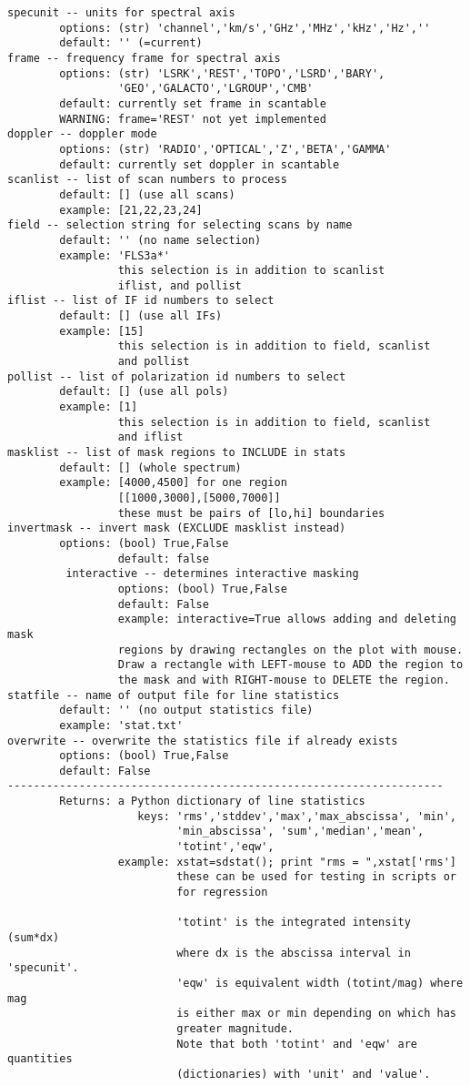 \begin{verbatim}
specunit -- units for spectral axis
        options: (str) 'channel','km/s','GHz','MHz','kHz','Hz',''
        default: '' (=current)
frame -- frequency frame for spectral axis
        options: (str) 'LSRK','REST','TOPO','LSRD','BARY',
                 'GEO','GALACTO','LGROUP','CMB'
        default: currently set frame in scantable
        WARNING: frame='REST' not yet implemented
doppler -- doppler mode
        options: (str) 'RADIO','OPTICAL','Z','BETA','GAMMA'
        default: currently set doppler in scantable
scanlist -- list of scan numbers to process
        default: [] (use all scans)
        example: [21,22,23,24]
field -- selection string for selecting scans by name
        default: '' (no name selection)
        example: 'FLS3a*'
                 this selection is in addition to scanlist
                 iflist, and pollist
iflist -- list of IF id numbers to select
        default: [] (use all IFs)
        example: [15]
                 this selection is in addition to field, scanlist
                 and pollist
pollist -- list of polarization id numbers to select
        default: [] (use all pols)
        example: [1]
                 this selection is in addition to field, scanlist
                 and iflist
masklist -- list of mask regions to INCLUDE in stats
        default: [] (whole spectrum)
        example: [4000,4500] for one region
                 [[1000,3000],[5000,7000]]
                 these must be pairs of [lo,hi] boundaries
invertmask -- invert mask (EXCLUDE masklist instead)
        options: (bool) True,False
                 default: false
         interactive -- determines interactive masking
                 options: (bool) True,False
                 default: False
                 example: interactive=True allows adding and deleting mask 
                 regions by drawing rectangles on the plot with mouse. 
                 Draw a rectangle with LEFT-mouse to ADD the region to 
                 the mask and with RIGHT-mouse to DELETE the region. 
statfile -- name of output file for line statistics
        default: '' (no output statistics file)
        example: 'stat.txt'
overwrite -- overwrite the statistics file if already exists 
        options: (bool) True,False
        default: False
-------------------------------------------------------------------
        Returns: a Python dictionary of line statistics
                    keys: 'rms','stddev','max','max_abscissa', 'min',
                          'min_abscissa', 'sum','median','mean',
                          'totint','eqw', 
                 example: xstat=sdstat(); print "rms = ",xstat['rms']
                          these can be used for testing in scripts or
                          for regression
        
                          'totint' is the integrated intensity (sum*dx)
                          where dx is the abscissa interval in 'specunit'.
                          'eqw' is equivalent width (totint/mag) where mag
                          is either max or min depending on which has
                          greater magnitude. 
                          Note that both 'totint' and 'eqw' are quantities
                          (dictionaries) with 'unit' and 'value'. 


\end{verbatim}
